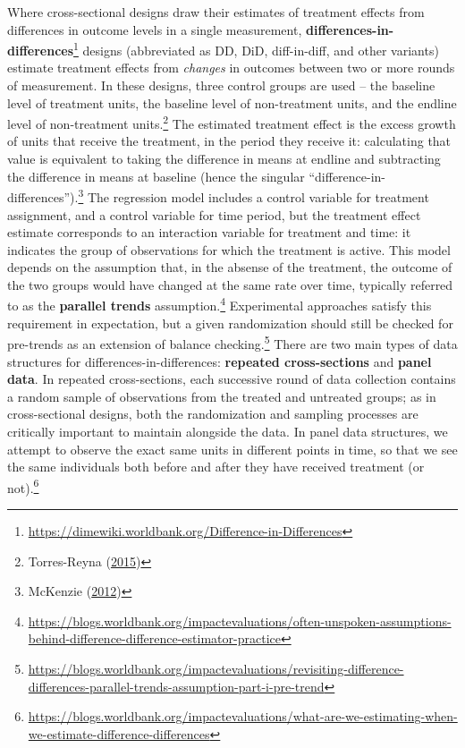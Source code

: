 \documentclass[
]{book}
\begin{document}
Where cross-sectional designs draw their estimates of treatment effects
from differences in outcome levels in a single measurement,
\textbf{differences-in-differences}\footnote{\url{https://dimewiki.worldbank.org/Difference-in-Differences}}
designs (abbreviated as DD, DiD, diff-in-diff, and other variants)
estimate treatment effects from \emph{changes} in outcomes
between two or more rounds of measurement.
In these designs, three control groups are used --
the baseline level of treatment units,
the baseline level of non-treatment units,
and the endline level of non-treatment units.\footnote{Torres-Reyna (\protect\hyperlink{ref-torres2015}{2015})}
The estimated treatment effect is the excess growth
of units that receive the treatment, in the period they receive it:
calculating that value is equivalent to taking
the difference in means at endline and subtracting
the difference in means at baseline
(hence the singular ``difference-in-differences'').\footnote{McKenzie (\protect\hyperlink{ref-mckenzie2012beyond}{2012})}
The regression model includes a control variable for treatment assignment,
and a control variable for time period,
but the treatment effect estimate corresponds to
an interaction variable for treatment and time:
it indicates the group of observations for which the treatment is active.
This model depends on the assumption that,
in the absense of the treatment,
the outcome of the two groups would have changed at the same rate over time,
typically referred to as the \textbf{parallel trends} assumption.\footnote{\url{https://blogs.worldbank.org/impactevaluations/often-unspoken-assumptions-behind-difference-difference-estimator-practice}}
Experimental approaches satisfy this requirement in expectation,
but a given randomization should still be checked for pre-trends
as an extension of balance checking.\footnote{\url{https://blogs.worldbank.org/impactevaluations/revisiting-difference-differences-parallel-trends-assumption-part-i-pre-trend}}
There are two main types of data structures for differences-in-differences:
\textbf{repeated cross-sections} and \textbf{panel data}.
In repeated cross-sections, each successive round of data collection contains a random sample
of observations from the treated and untreated groups;
as in cross-sectional designs, both the randomization and sampling processes
are critically important to maintain alongside the data.
In panel data structures, we attempt to observe the exact same units
in different points in time, so that we see the same individuals
both before and after they have received treatment (or not).\footnote{\url{https://blogs.worldbank.org/impactevaluations/what-are-we-estimating-when-we-estimate-difference-differences}}
\end{document}
